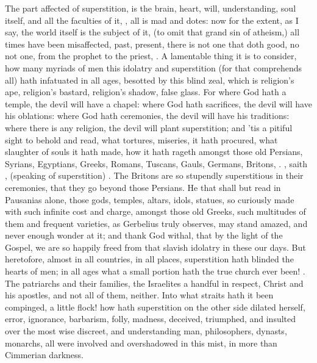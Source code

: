 {The part affected of superstition, is the brain, heart, will,
understanding, soul itself, and all the faculties of it, , all is mad and dotes: now for the extent, as I say, the
world itself is the subject of it, (to omit that grand sin of atheism,)
all times have been misaffected, past, present, there is not one that
doth good, no not one, from the prophet to the priest, \etc{}. A lamentable
thing it is to consider, how many myriads of men this idolatry and
superstition (for that comprehends all) hath infatuated in all ages,
besotted by this blind zeal, which is religion's ape, religion's
bastard, religion's shadow, false glass. For where God hath a temple,
the devil will have a chapel: where God hath sacrifices, the devil will
have his oblations: where God hath ceremonies, the devil will have his
traditions: where there is any religion, the devil will plant
superstition; and 'tis a pitiful sight to behold and read, what
tortures, miseries, it hath procured, what slaughter of souls it hath
made, how it hath rageth amongst those old Persians, Syrians, Egyptians,
Greeks, Romans, Tuscans, Gauls, Germans, Britons, \etc{}. , saith \Pliny{}, 
(speaking of superstition) . The Britons
are so stupendly superstitious in their ceremonies, that they go beyond
those Persians. He that shall but read in Pausanias alone, those gods,
temples, altars, idols, statues, so curiously made with such infinite
cost and charge, amongst those old Greeks, such multitudes of them and
frequent varieties, as Gerbelius truly observes, may stand
amazed, and never enough wonder at it; and thank God withal, that by
the light of the Gospel, we are so happily freed from that slavish
idolatry in these our days. But heretofore, almost in all countries, in
all places, superstition hath blinded the hearts of men; in all ages
what a small portion hath the true church ever been! . The patriarchs and their families, the
Israelites a handful in respect, Christ and his apostles, and not all
of them, neither. Into what straits hath it been compinged, a little
flock! how hath superstition on the other side dilated herself, error,
ignorance, barbarism, folly, madness, deceived, triumphed, and insulted
over the most wise discreet, and understanding man, philosophers,
dynasts, monarchs, all were involved and overshadowed in this mist, in
more than Cimmerian darkness. }
